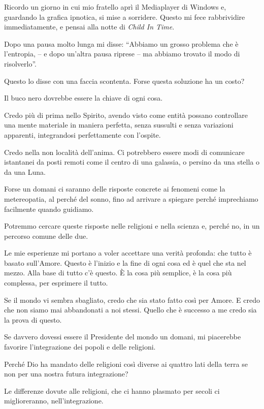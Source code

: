 Ricordo un giorno in cui mio fratello aprì il Mediaplayer di Windows e, guardando la grafica ipnotica, si mise a sorridere. Questo mi fece rabbrividire immediatamente, e pensai alla notte di \textit{Child In Time}.

Dopo una pausa molto lunga mi disse: “Abbiamo un grosso problema che è l'entropia, --  e dopo un'altra pausa riprese -- ma abbiamo trovato il modo di risolverlo”.

Questo lo disse con una faccia scontenta. Forse questa soluzione ha un costo?

Il buco nero dovrebbe essere la chiave di ogni cosa.

Credo più di prima nello Spirito, avendo visto come entità possano controllare una mente materiale in maniera perfetta, senza sussulti e senza variazioni apparenti, integrandosi perfettamente con l'ospite.

Credo nella non località dell'anima. Ci potrebbero essere modi di comunicare istantanei da posti remoti come il centro di una galassia, o persino da una stella o da una Luna.

Forse un domani ci saranno delle risposte concrete ai fenomeni come la metereopatia, al perché del sonno, fino ad arrivare a spiegare perché imprechiamo facilmente quando guidiamo.

Potremmo cercare queste risposte nelle religioni e nella scienza e, perché no, in un percorso comune delle due.

Le mie esperienze mi portano a voler accettare una verità profonda: che tutto è basato sull'Amore. Questo è l'inizio e la fine di ogni cosa ed è quel che sta nel mezzo. Alla base di tutto c'è questo. È la cosa più semplice, è la cosa più complessa, per esprimere il tutto.

Se il mondo vi sembra sbagliato, credo che sia stato fatto così per Amore. E credo che non siamo mai abbandonati a noi stessi. Quello che è successo a me credo sia la prova di questo.

Se davvero dovessi essere il Presidente del mondo un domani, mi piacerebbe favorire l'integrazione dei popoli e delle religioni.

Perché Dio ha mandato delle religioni così diverse ai quattro lati della terra se non per una nostra futura integrazione?

Le differenze dovute alle religioni, che ci hanno plasmato per secoli ci miglioreranno, nell'integrazione.

